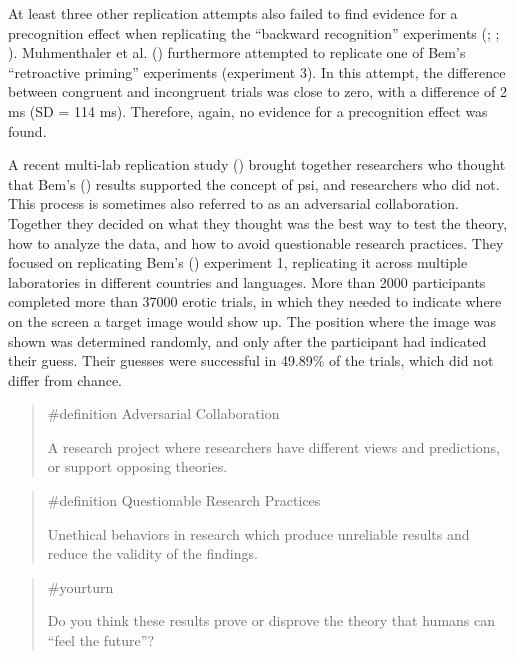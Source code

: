 \documentclass[
  letterpaper,
]{book}
\begin{document}
At least three other replication attempts also failed to find evidence
for a precognition effect when replicating the ``backward recognition''
experiments (; ; ). Muhmenthaler et al.
() furthermore
attempted to replicate one of Bem's ``retroactive priming'' experiments
(experiment 3). In this attempt, the difference between congruent and
incongruent trials was close to zero, with a difference of 2 ms (SD =
114 ms). Therefore, again, no evidence for a precognition effect was
found.

A recent multi-lab replication study
() brought together
researchers who thought that Bem's
() results supported the concept of
psi, and researchers who did not. This process is sometimes also
referred to as an adversarial collaboration. Together they decided on
what they thought was the best way to test the theory, how to analyze
the data, and how to avoid questionable research practices. They focused
on replicating Bem's () experiment
1, replicating it across multiple laboratories in different countries
and languages. More than 2000 participants completed more than 37000
erotic trials, in which they needed to indicate where on the screen a
target image would show up. The position where the image was shown was
determined randomly, and only after the participant had indicated their
guess. Their guesses were successful in 49.89\% of the trials, which did
not differ from chance.

\begin{quote}
\label{def-adversarialcollaboration}{\#definition}
Adversarial Collaboration

A research project where researchers have different views and
predictions, or support opposing theories.
\end{quote}

\begin{quote}
\label{def-questionableresearchpractices}{\#definition}
Questionable Research Practices

Unethical behaviors in research which produce unreliable results and
reduce the validity of the findings.
\end{quote}

\begin{quote}
{\#yourturn}

Do you think these results prove or disprove the theory that humans can
``feel the future''?
\end{quote}
\end{document}
